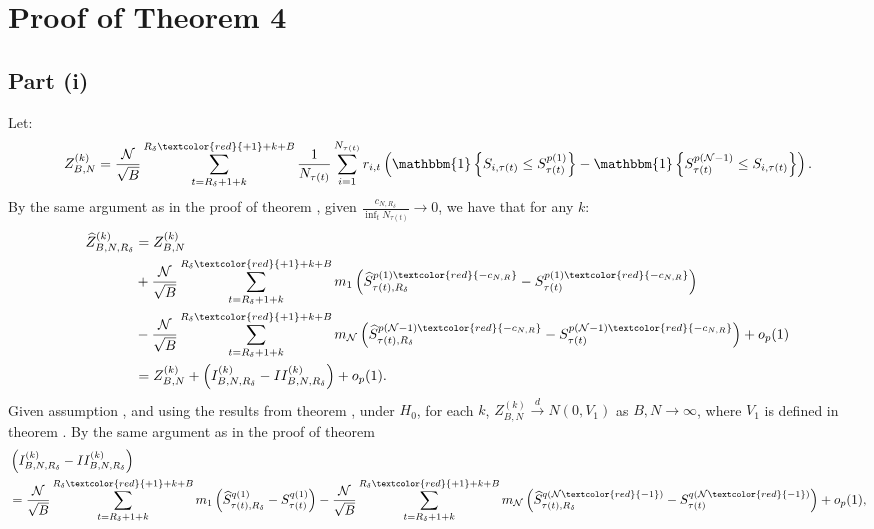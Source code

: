 
\section{Proof of Theorem 4}
\label{Proof of th:subsampling}

\subsection{Part (i)}

Let: 
\begin{align*}
Z_{B,N}^{(k)}=\frac{\mathcal{N}}{\sqrt{B}}\sum_{t=R_\delta+1+k}^{R_\delta \textcolor{red}{+1}+k+B}\frac{1}{N_{\tau(t)}} \sum_{i=1}^{N_{\tau(t)}}r_{i,t}\left( \mathbbm{1} \left\{ S_{i,\tau(t) }\leq S_{\tau(t) }^{p(1)}\right\} - \mathbbm{1} \left\{ S_{\tau(t) }^{p(\mathcal{N}-1)} \leq S_{i,\tau(t) } \right\} \right).
\end{align*}
By the same argument as in the proof of theorem %
, given $\frac{c_{N,R_\delta}}{\inf_{t}N_{\tau(t)}}\rightarrow 0$, we have that for any $k$:
\begin{align*}
\widehat{Z}_{B,N,R_\delta}^{(k)} &= Z_{B,N}^{(k)} \\
& +\frac{\mathcal{N}}{\sqrt{B}}\sum_{t=R_\delta+1+k}^{R_\delta\textcolor{red}{+1}+k+B} m_{1} \left( \widehat{S}_{\tau(t),R_\delta}^{p(1)\textcolor{red}{-c_{N,R}}}-S_{\tau(t)}^{p(1)\textcolor{red}{-c_{N,R}}}\right) \\
& -\frac{\mathcal{N}}{\sqrt{B}}\sum_{t=R_\delta+1+k}^{R_\delta\textcolor{red}{+1}+k+B} m_{\mathcal{N}} \left( \widehat{S}_{\tau(t),R_\delta}^{p(\mathcal{N}-1)\textcolor{red}{-c_{N,R}}}-S_{\tau(t)}^{p(\mathcal{N}-1)\textcolor{red}{-c_{N,R}}}\right) +o_{p}(1) \\
&= Z_{B,N}^{(k)}+\left( I_{B,N,R_\delta}^{(k)}-II_{B,N,R_\delta}^{(k)}\right) +o_{p}(1).
\end{align*}
Given assumption %
, and using the results from theorem %
, under $H_{0}$, for each $k$, $Z_{B,N}^{(k)}\overset{d}{\rightarrow }N(0,V_{1})$ as $B,N\rightarrow \infty $, where $V_{1}$ is defined in theorem %
. By the same argument as in the proof of theorem %
\begin{align*}
& \left( I_{B,N,R_\delta}^{(k)}-II_{B,N,R_\delta}^{(k)}\right) \\
&= \frac{\mathcal{N}}{\sqrt{B}}\sum_{t=R_\delta+1+k}^{R_\delta\textcolor{red}{+1}+k+B} m_{1} \left( \widehat{S}_{\tau(t), R_\delta}^{q(1)}-S_{\tau(t) }^{q(1)}\right) -\frac{\mathcal{N}}{\sqrt{B}}\sum_{t=R_\delta+1+k}^{R_\delta\textcolor{red}{+1}+k+B} m_{\mathcal{N}} \left(\widehat{S}_{\tau(t) ,R_\delta}^{q(\mathcal{N}\textcolor{red}{-1})}-S_{\tau(t) }^{q(\mathcal{N}\textcolor{red}{-1})}\right) +o_{p}(1),
\end{align*}
